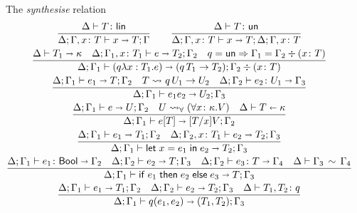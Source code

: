 \begin{figure}[h!]
  The \emph{synthesise} relation\hfill{}
  \begin{gather*}
    \frac{
      \isLin T
    }{
      \algtypeout[\kindEnv;\varEnv, x\colon T] x T \varEnv
    }
    \qquad
    \frac{
      \isUn T
    }{
      \algtypeout[\kindEnv;\varEnv, x\colon T] x T {\kindEnv;\varEnv, x\colon T}
    }
    \\
    \frac{
      \algkindout{T_1} \kind
      \quad
      \algtypeout[\kindEnv;\varEnv_1,x\colon T_1]{e}{T_2}{\varEnv_2}
      \quad
      q=\unk \Rightarrow \varEnv_1 = \varEnv_2 \div (x\colon T)
    }{
      \algtypeout[\kindEnv;\varEnv_1]{(q\lambda x:T_1.e)}{(q\,T_1 \rightarrow T_2)}{\varEnv_2 \div (x\colon T)}
    }
    \\
    \frac{
      \algtypeout[\kindEnv;\varEnv_1]{e_1}{T}{\varEnv_2}
      \quad
      T \Extract{} q\,U_1\rightarrow U_2
      \quad
      \algtypein[\kindEnv;\varEnv_2]{e_2}{U_1}{\varEnv_3}
    }{
      \algtypeout[\kindEnv;\varEnv_1]{e_1e_2}{U_2}{\varEnv_3}
    }
    \\
    \frac{
      \algtypeout[\kindEnv;\varEnv_1]{e}{U}{\varEnv_2}
      \quad
      U \Extract{\forall} (\forall x\colon\kind.V)
      \quad
      \algkindin T \kind
    }{
      \algtypeout[\kindEnv;\varEnv_1]{e[T]}{\subs T x V}{\varEnv_2}
    }
    \\
    \frac{
      \algtypeout[\kindEnv;\varEnv_1]{e_1}{T_1}{\varEnv_2}
      \quad
      \algtypeout[\kindEnv;\varEnv_2,x\colon T_1]{e_2}{T_2}{\Gamma_3}
    }{
      \algtypeout[\kindEnv;\varEnv_1]{\unlete{x}{e_1}{e_2}}{T_2}{\varEnv_3}
    }
    \\
    \frac{
      \algtypein[\kindEnv;\varEnv_1]{e_1}{\boole}{\varEnv_2}
      \quad
      \algtypeout[\kindEnv;\varEnv_2]{e_2}{T}{\varEnv_3}
      \quad
      \algtypein[\kindEnv;\varEnv_2]{e_3}{T}{\varEnv_4}
      \quad
      \ctxequiv{\varEnv_3}{\varEnv_4}
    }{
      \algtypeout[\kindEnv;\varEnv_1]{\conditionale{e_1}{e_2}{e_3}}{T}{\varEnv_3}
    }
    \\
    \frac{
      \algtypeout[\kindEnv ; \varEnv_1]{e_1}{T_1}{\varEnv_2}
      \quad
      \algtypeout[\kindEnv ; \varEnv_2]{e_2}{T_2}{\varEnv_3}
      \quad
      \isqualifier{T_1,T_2}{q}
    }{
      \algtypeout[\kindEnv ; \varEnv_1]{q(e_1, e_2)}{(T_1,T_2)}{\varEnv_3}
    }
    \\

\end{gather*}
\end{figure}
